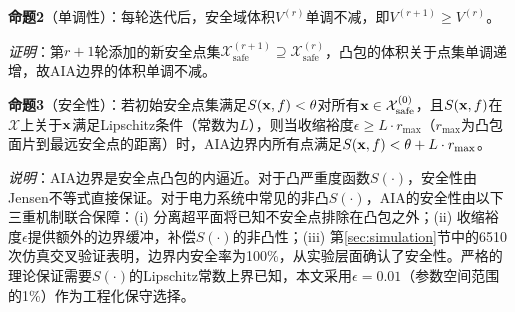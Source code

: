\textbf{命题2}（单调性）：每轮迭代后，安全域体积$V^{(r)}$单调不减，即$V^{(r+1)} \geq V^{(r)}$。

\textit{证明}：第$r+1$轮添加的新安全点集$\mathcal{X}_{\text{safe}}^{(r+1)} \supseteq \mathcal{X}_{\text{safe}}^{(r)}$，凸包的体积关于点集单调递增\cite{boyd2004convex}，故AIA边界的体积单调不减。

\textbf{命题3}（安全性）：若初始安全点集满足$S(\mathbf{x}, f) < \theta$对所有$\mathbf{x} \in \mathcal{X}_{\text{safe}}^{(0)}$，且$S(\mathbf{x}, f)$在$\mathcal{X}$上关于$\mathbf{x}$满足Lipschitz条件（常数为$L$），则当收缩裕度$\epsilon \geq L \cdot r_{\max}$（$r_{\max}$为凸包面片到最远安全点的距离）时，AIA边界内所有点满足$S(\mathbf{x}, f) < \theta + L \cdot r_{\max}$。

\textit{说明}：AIA边界是安全点凸包的内逼近。对于凸严重度函数$S(\cdot)$，安全性由Jensen不等式直接保证。对于电力系统中常见的非凸$S(\cdot)$，AIA的安全性由以下三重机制联合保障：(i) 分离超平面将已知不安全点排除在凸包之外；(ii) 收缩裕度$\epsilon$提供额外的边界缓冲，补偿$S(\cdot)$的非凸性；(iii) 第\ref{sec:simulation}节中的6510次仿真交叉验证表明，边界内安全率为100\%，从实验层面确认了安全性。严格的理论保证需要$S(\cdot)$的Lipschitz常数上界已知，本文采用$\epsilon = 0.01$（参数空间范围的1\%）作为工程化保守选择。
